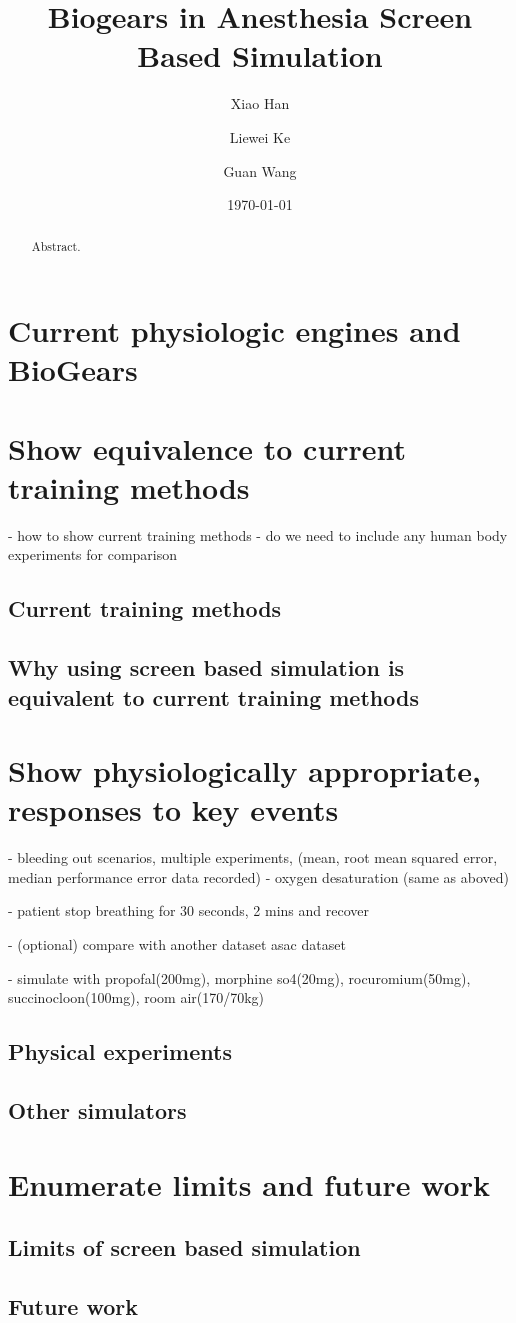 \documentclass[a4paper]{article}
\title{Biogears in Anesthesia Screen Based Simulation}
\author{
  Xiao Han\\
  \and Liewei Ke
  \and Guan Wang
}
\date{\today}
\begin{document}
\maketitle

\begin{abstract}
Abstract.
\end{abstract}

\section{Current physiologic engines and BioGears}

\section{Show equivalence to current training methods}

- how to show current training methods
- do we need to include any human body experiments for comparison

\subsection{Current training methods}
\subsection{Why using screen based simulation is equivalent to current training methods}

\section{Show physiologically appropriate, responses to key events}

- bleeding out scenarios, multiple experiments, (mean, root mean squared error, median performance error data recorded)
- oxygen desaturation (same as aboved)

- patient stop breathing for 30 seconds, 2 mins and recover

- (optional) compare with another dataset asac dataset

- simulate with propofal(200mg), morphine so4(20mg), rocuromium(50mg), succinocloon(100mg), room air(170/70kg)

\subsection{Physical experiments}
\subsection{Other simulators}

\section{Enumerate limits and future work}
\subsection{Limits of screen based simulation}
\subsection{Future work}
\end{document}
